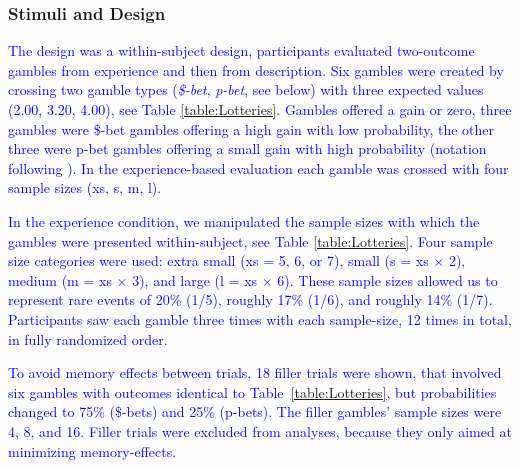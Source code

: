 \documentclass[a4paper, man, natbib, floatsintext]{apa6} %
\begin{document}
\subsubsection{Stimuli and Design}
\textcolor{blue}{The design was a within-subject design, participants evaluated two-outcome gambles from experience and then from description. Six gambles were created by crossing two gamble types (\textit{\$-bet}, \textit{p-bet}, see below) with three expected values (2.00, 3.20, 4.00), see Table \ref{table:Lotteries}. Gambles offered a gain or zero, three gambles were \$-bet gambles offering a high gain with low probability, the other three were p-bet gambles offering a small gain with high probability (notation following \citealp{Lichtenstein1971}). In the experience-based evaluation each gamble was crossed with four sample sizes (xs, s, m, l). }

\textcolor{blue}{In the experience condition, we manipulated the sample sizes with which the gambles were presented within-subject, see Table \ref{table:Lotteries}. Four sample size categories were used: extra small (xs = 5, 6, or 7), small (s = xs $\times$ 2), medium (m = xs $\times$ 3), and large (l = xs $\times$ 6). These sample sizes allowed us to represent rare events of 20\% (1/5), roughly 17\% (1/6), and roughly 14\% (1/7). Participants saw each gamble three times with each sample-size, 12 times in total, in fully randomized order.} %

\textcolor{blue}{To avoid memory effects between trials, 18 filler trials were shown, that involved six gambles with outcomes identical to Table~\ref{table:Lotteries}, but probabilities changed to 75\% (\$-bets) and 25\% (p-bets). The filler gambles' sample sizes were 4, 8, and 16. Filler trials were excluded from analyses, because they only aimed at minimizing memory-effects.}
\end{document}
